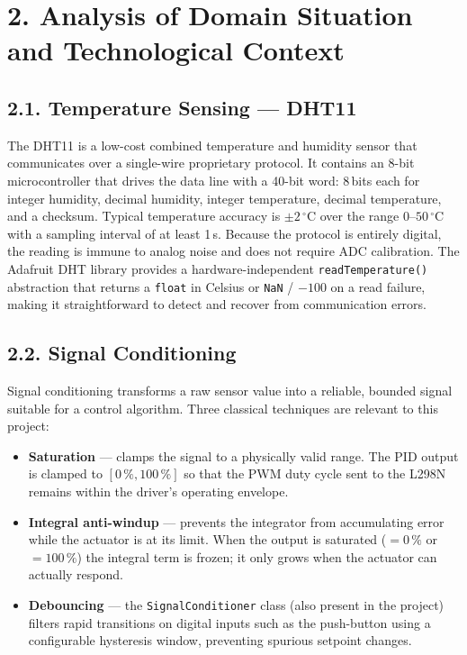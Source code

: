\documentclass[12pt]{article}
\begin{document}
\section*{2. Analysis of Domain Situation and Technological Context}

\subsection*{2.1. Temperature Sensing --- DHT11}

The DHT11 is a low-cost combined temperature and humidity sensor that communicates over a single-wire
proprietary protocol. It contains an 8-bit microcontroller that drives the data line with a 40-bit
word: 8\,bits each for integer humidity, decimal humidity, integer temperature, decimal temperature,
and a checksum. Typical temperature accuracy is $\pm2\,^\circ$C over the range $0$--$50\,^\circ$C
with a sampling interval of at least 1\,s. Because the protocol is entirely digital, the reading is
immune to analog noise and does not require ADC calibration. The Adafruit DHT library provides a
hardware-independent \texttt{readTemperature()} abstraction that returns a \texttt{float} in Celsius
or \texttt{NaN} / $-100$ on a read failure, making it straightforward to detect and recover from
communication errors.

\subsection*{2.2. Signal Conditioning}

Signal conditioning transforms a raw sensor value into a reliable, bounded signal suitable for a
control algorithm. Three classical techniques are relevant to this project:

\begin{itemize}
    \item \textbf{Saturation} --- clamps the signal to a physically valid range. The PID output is
          clamped to $[0\,\%, 100\,\%]$ so that the PWM duty cycle sent to the L298N remains within
          the driver's operating envelope.
    \item \textbf{Integral anti-windup} --- prevents the integrator from accumulating error while the
          actuator is at its limit. When the output is saturated ($= 0\,\%$ or $= 100\,\%$) the integral
          term is frozen; it only grows when the actuator can actually respond.
    \item \textbf{Debouncing} --- the \texttt{SignalConditioner} class (also present in the project)
          filters rapid transitions on digital inputs such as the push-button using a configurable
          hysteresis window, preventing spurious setpoint changes.
\end{itemize}
\end{document}
